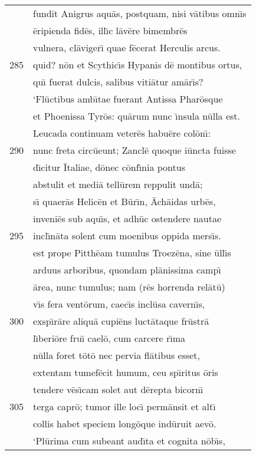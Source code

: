 \documentclass[paper=6in:9in,pagesize=pdftex,
               headinclude=on,footinclude=on,12pt]{scrbook}
\begin{document}
\begin{longtable}[p]{ r l }
 & fundit Anigrus aqu\=as, postquam, nisi v\=atibus omn\={\i}s\\ 
 & \=eripienda fid\=es, ill\={\i}c l\=av\=ere bimembr\=es\\ 
 & vulnera, cl\=aviger\={\i} quae f\=ecerat Herculis arcus.\\ 
285 & quid? n\=on et Scythic\={\i}s Hypanis d\=e montibus ortus,\\ 
 & qu\={\i} fuerat dulcis, salibus viti\=atur am\=ar\={\i}s?\\ 
 & \indent `Fl\=uctibus amb\={\i}tae fuerant Antissa Phar\=osque\\ 
 & et Phoenissa Tyr\=os: qu\=arum nunc \={\i}nsula n\=ulla est.\\ 
 & Leucada continuam veter\=es habu\=ere col\=on\={\i}:\\ 
290 & nunc freta circ\=ueunt; Zancl\=e quoque i\=uncta fuisse\\ 
 & d\={\i}citur \=Italiae, d\=onec c\=onf\={\i}nia pontus\\ 
 & abstulit et medi\=a tell\=urem reppulit und\=a;\\ 
 & s\={\i} quaer\=as Helic\=en et B\=ur\={\i}n, \=Ach\=aidas urb\=es,\\ 
 & inveni\=es sub aqu\={\i}s, et adh\=uc ostendere nautae\\ 
295 & incl\={\i}n\=ata solent cum moenibus oppida mers\={\i}s.\\ 
 & est prope Pitth\=eam tumulus Troez\=ena, sine \=ull\={\i}s\\ 
 & arduus arboribus, quondam pl\=anissima camp\={\i}\\ 
 & \=area, nunc tumulus; nam (r\=es horrenda rel\=at\=u)\\ 
 & v\={\i}s fera vent\=orum, caec\={\i}s incl\=usa cavern\={\i}s,\\ 
300 & exsp\={\i}r\=are aliqu\=a cupi\=ens luct\=ataque fr\=ustr\=a\\ 
 & l\={\i}beri\=ore fru\={\i} cael\=o, cum carcere r\={\i}ma\\ 
 & n\=ulla foret t\=ot\=o nec pervia fl\=atibus esset,\\ 
 & extentam tumef\=ecit humum, ceu sp\={\i}ritus \=oris\\ 
 & tendere v\=es\={\i}cam solet aut d\=erepta bicorn\={\i}\\ 
305 & terga capr\=o; tumor ille loc\={\i} perm\=ansit et alt\={\i}\\ 
 & collis habet speciem long\=oque ind\=uruit aev\=o.\\ 
 & \indent `Pl\=urima cum subeant aud\={\i}ta et cognita n\=ob\={\i}s,\\ 

\end{longtable}
\end{document}
